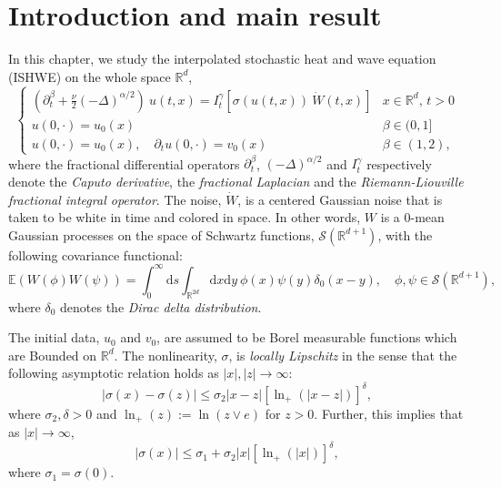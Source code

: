 \documentclass[12pt]{report}
\theoremstyle{plain}
\theoremstyle{definition}
\numberwithin{equation}{section}
\newcommand{\R}{\mathbb{R}}
\newcommand{\ud}{\ensuremath{ \mathrm{d} }}
\begin{document}
	\section{Introduction and main result}
In this chapter, we study the interpolated stochastic heat and wave equation (ISHWE) on the whole space $\R^d$,
\begin{equation} \label{E:SupLinSPDE}
\begin{cases}
\left(\partial^\beta_t + \frac{\nu}{2}(-\Delta)^{\alpha/2}\right)\: u(t,x) = I^\gamma_t \left[\sigma( u(t,x)) \: \dot W(t,x) \right] & \text{$x\in \R^d$, $t>0$} \\
u(0,\cdot) = u_0(x)                                                                                                         & \beta \in (0,1]               \\
u(0,\cdot) = u_0(x), \quad \partial_t u(0,\cdot) = v_0(x)                                                                            & \beta \in (1,2),
\end{cases}
\end{equation}
where the fractional differential operators $\partial^\beta_t$, $(-\Delta)^{\alpha/2}$ and $I^\gamma_t$ respectively denote the {\em Caputo derivative}, the {\em fractional Laplacian} and the {\em Riemann-Liouville fractional integral operator}. The noise, $\dot{W}$, is a centered Gaussian noise that is taken to be white in time and colored in space. In other words, $W$ is a $0$-mean Gaussian processes on the space of Schwartz functions, $\mathscr{S}(\R^{d+1})$, with the following covariance functional:
\[
\mathbb{E}\left(W(\phi)W(\psi)\right) = \int_0^\infty \ud s \int_{\R^{2d}} \ud x \ud y \: \phi(x) \psi(y) \delta_0(x-y), \quad \phi, \psi \in \mathscr{S}(\R^{d+1}),
\]
where $\delta_0$ denotes the {\em Dirac delta distribution}.

The initial data, $u_0$ and $v_0$, are assumed to be Borel measurable functions which are Bounded on $\R^d$. The nonlinearity, $\sigma$, is {\em locally Lipschitz} in the sense that the following asymptotic relation holds as $|x|,|z| \to \infty$:
\begin{equation}
\label{C:SigSupLin}
|\sigma(x)-\sigma(z)| \le \sigma_2|x-z|[\ln_+(|x-z|)]^{\delta},
\end{equation}
where $\sigma_2 , \delta >0$ and $\ln_+(z) := \ln(z \vee e)$ for $z >0$. Further, this implies that as $|x| \to \infty$,
\begin{equation}
|\sigma(x)| \le \sigma_1 + \sigma_2|x|[\ln_+(|x|)]^{\delta},
\end{equation}
where $\sigma_1 = \sigma(0)$.
\end{document}
